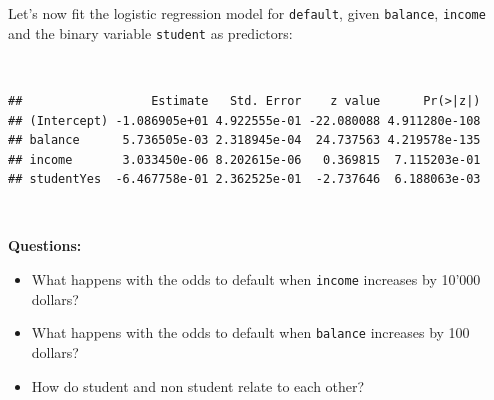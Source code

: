 \documentclass[
  10pt,
  ignorenonframetext,
]{beamer}
\newenvironment{Shaded}{\begin{snugshade}}{\end{snugshade}}
\newcommand{\AttributeTok}[1]{\textcolor[rgb]{0.13,0.29,0.53}{#1}}
\newcommand{\FunctionTok}[1]{\textcolor[rgb]{0.13,0.29,0.53}{\textbf{#1}}}
\newcommand{\NormalTok}[1]{#1}
\newcommand{\OtherTok}[1]{\textcolor[rgb]{0.56,0.35,0.01}{#1}}
\newcommand{\SpecialCharTok}[1]{\textcolor[rgb]{0.81,0.36,0.00}{\textbf{#1}}}
\newcommand{\StringTok}[1]{\textcolor[rgb]{0.31,0.60,0.02}{#1}}
\providecommand{\tightlist}{%
  \setlength{\itemsep}{0pt}\setlength{\parskip}{0pt}}
\begin{document}
\begin{frame}[fragile]
Let's now fit the logistic regression model for \texttt{default}, given
\texttt{balance}, \texttt{income} and the binary variable
\texttt{student} as predictors:

\(~\)

\scriptsize

\begin{Shaded}
\end{Shaded}

\begin{verbatim}
##                  Estimate   Std. Error    z value      Pr(>|z|)
## (Intercept) -1.086905e+01 4.922555e-01 -22.080088 4.911280e-108
## balance      5.736505e-03 2.318945e-04  24.737563 4.219578e-135
## income       3.033450e-06 8.202615e-06   0.369815  7.115203e-01
## studentYes  -6.467758e-01 2.362525e-01  -2.737646  6.188063e-03
\end{verbatim}

\(~\)

\normalsize

\textbf{Questions:}

\begin{itemize}
\tightlist
\item
  What happens with the odds to default when \texttt{income} increases
  by 10'000 dollars?
\end{itemize}

\begin{itemize}
\tightlist
\item
  What happens with the odds to default when \texttt{balance} increases
  by 100 dollars?
\end{itemize}

\begin{itemize}
\tightlist
\item
  How do student and non student relate to each other?
\end{itemize}

\begin{block}{}
\protect\hypertarget{section}{}
\end{block}


\end{frame}
\end{document}
